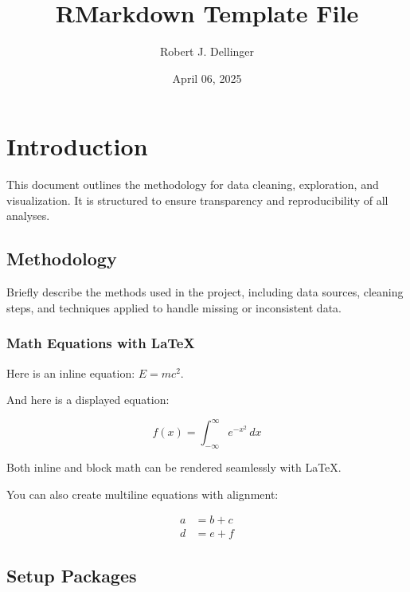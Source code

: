 \documentclass[
  12pt,
]{article}
\title{\textbf{RMarkdown Template File}}
\author{Robert J. Dellinger}
\date{April 06, 2025}
\begin{document}
\maketitle

{
\setcounter{tocdepth}{3}
\tableofcontents
}
\newpage

\section{Introduction}\label{introduction}

This document outlines the methodology for data cleaning, exploration,
and visualization. It is structured to ensure transparency and
reproducibility of all analyses.

\subsection{Methodology}\label{methodology}

Briefly describe the methods used in the project, including data
sources, cleaning steps, and techniques applied to handle missing or
inconsistent data.

\subsubsection{Math Equations with
LaTeX}\label{math-equations-with-latex}

Here is an inline equation: \(E = mc^2\).

And here is a displayed equation:

\begin{equation}
f(x) = \int_{-\infty}^{\infty} e^{-x^2} \, dx
\end{equation}

Both inline and block math can be rendered seamlessly with LaTeX.

You can also create multiline equations with alignment:

\begin{equation}
\begin{aligned}
a &= b + c \\
d &= e + f
\end{aligned}
\end{equation}

\subsection{Setup Packages}\label{setup-packages}
\end{document}
